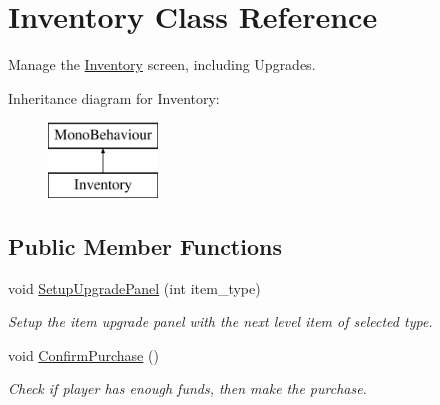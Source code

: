 \hypertarget{class_inventory}{}\section{Inventory Class Reference}
\label{class_inventory}


Manage the \mbox{\hyperlink{class_inventory}{Inventory}} screen, including Upgrades.  


Inheritance diagram for Inventory\+:\begin{figure}[H]
\begin{center}
\leavevmode
\includegraphics[height=2.000000cm]{class_inventory}
\end{center}
\end{figure}
\subsection*{Public Member Functions}
\begin{DoxyCompactItemize}
\item 
\mbox{\label{class_inventory_aa99e2b5246a749ec59f04aa1ce48416a}} 
void \mbox{\hyperlink{class_inventory_aa99e2b5246a749ec59f04aa1ce48416a}{Setup\+Upgrade\+Panel}} (int item\+\_\+type)
\begin{DoxyCompactList}\small\item\em Setup the item upgrade panel with the next level item of selected type. \end{DoxyCompactList}\item 
\mbox{\label{class_inventory_a284995426324c648b4c9144a3b9bc277}} 
void \mbox{\hyperlink{class_inventory_a284995426324c648b4c9144a3b9bc277}{Confirm\+Purchase}} ()
\begin{DoxyCompactList}\small\item\em Check if player has enough funds, then make the purchase. \end{DoxyCompactList}\end{DoxyCompactItemize}
